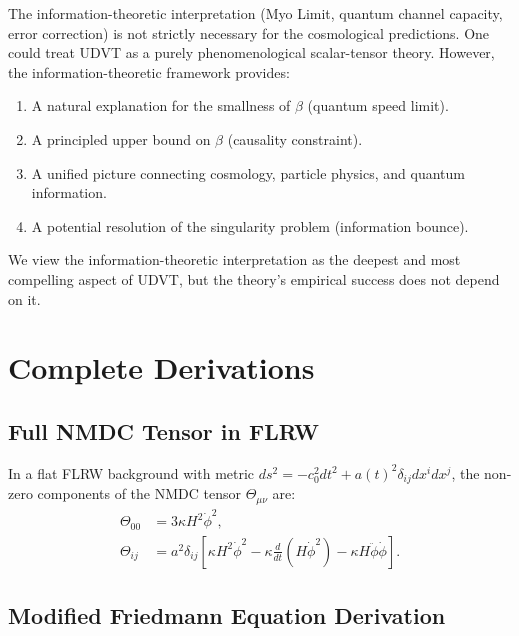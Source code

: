 \documentclass[12pt,a4paper]{book}
\theoremstyle{definition}
\theoremstyle{remark}
\begin{document}
The information-theoretic interpretation (Myo Limit, quantum channel capacity, error correction) is not strictly necessary for the cosmological predictions. One could treat UDVT as a purely phenomenological scalar-tensor theory. However, the information-theoretic framework provides:
\begin{enumerate}
    \item A natural explanation for the smallness of $\beta$ (quantum speed limit).
    \item A principled upper bound on $\beta$ (causality constraint).
    \item A unified picture connecting cosmology, particle physics, and quantum information.
    \item A potential resolution of the singularity problem (information bounce).
\end{enumerate}
We view the information-theoretic interpretation as the deepest and most compelling aspect of UDVT, but the theory's empirical success does not depend on it.

\appendix

\chapter{Complete Derivations}
\label{app:derivations}

\section{Full NMDC Tensor in FLRW}

In a flat FLRW background with metric $ds^2 = -c_0^2 dt^2 + a(t)^2 \delta_{ij} dx^i dx^j$, the non-zero components of the NMDC tensor $\Theta_{\mu\nu}$ are:
\begin{align}
    \Theta_{00} &= 3\kappa H^2 \dot{\phi}^2,\\
    \Theta_{ij} &= a^2 \delta_{ij} \left[\kappa H^2 \dot{\phi}^2 - \kappa \frac{d}{dt}(H\dot{\phi}^2) - \kappa H \ddot{\phi} \dot{\phi}\right].
\end{align}

\section{Modified Friedmann Equation Derivation}
\end{document}
